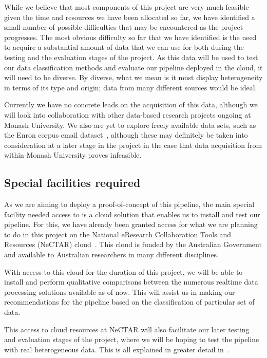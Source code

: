 \documentclass[a4paper,11pt]{article}
\begin{document}
While we believe that most components of this project are very much feasible given the time and resources we have been
allocated so far, we have identified a small number of possible difficulties that may be encountered as the project
progresses. The most obvious difficulty so far that we have identified is the need to acquire a substantial amount of
data that we can use for both during the testing and the evaluation stages of the project. As this data will be used to
test our data classification methods and evaluate our pipeline deployed in the cloud, it will need to be diverse. By
diverse, what we mean is it must display heterogeneity in terms of its type and origin; data from many different sources
would be ideal.

Currently we have no concrete leads on the acquisition of this data, although we will look into collaboration with other
data-based research projects ongoing at Monash University. We also are yet to explore freely available data sets, such
as the Enron corpus email dataset~\cite{klimt2004introducing}, although these may definitely be taken into consideration
at a later stage in the project in the case that data acquisition from within Monash University proves infeasible.


\subsection{Special facilities required} %
\label{sub:special_facilities_required}

As we are aiming to deploy a proof-of-concept of this pipeline, the main special facility needed access to is a cloud
solution that enables us to install and test our pipeline. For this, we have already been granted access for what we are
planning to do in this project on the National eResearch Collaboration Tools and Resources (NeCTAR)
cloud~\cite{web:Nectar}. This cloud is funded by the Australian Government and available to Australian researchers in
many different disciplines.

With access to this cloud for the duration of this project, we will be able to install and perform qualitative
comparisons between the numerous realtime data processing solutions available as of now. This will assist us in making
our recommendations for the pipeline based on the classification of particular set of data.

This access to cloud resources at NeCTAR will also facilitate our later testing and evaluation stages of the project,
where we will be hoping to test the pipeline with real heterogeneous data. This is all explained in greater detail
in~.
\end{document}
